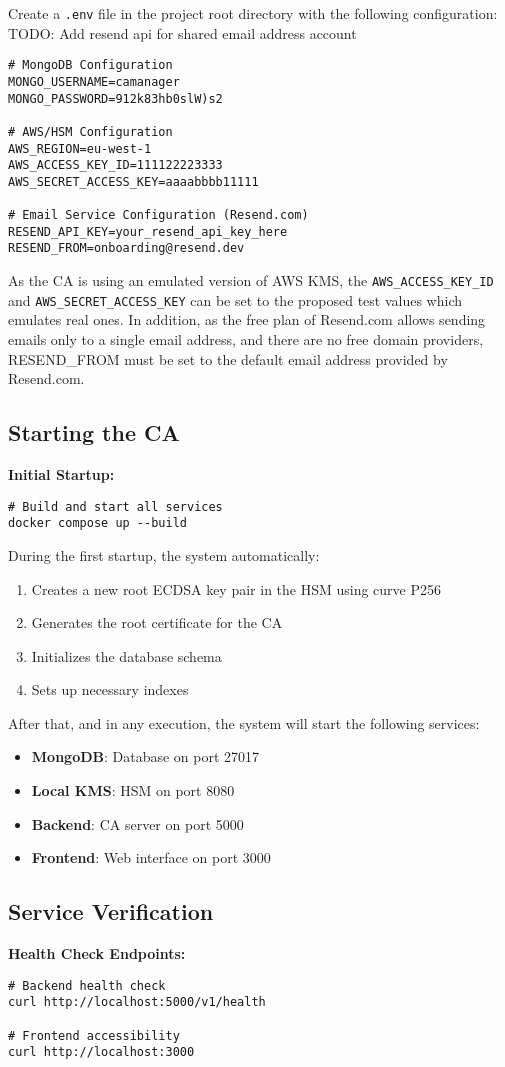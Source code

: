 Create a \texttt{.env} file in the project root directory with the following configuration:
{\color{red}TODO: Add resend api for shared email address account}
\begin{verbatim}
# MongoDB Configuration
MONGO_USERNAME=camanager
MONGO_PASSWORD=912k83hb0slW)s2

# AWS/HSM Configuration
AWS_REGION=eu-west-1
AWS_ACCESS_KEY_ID=111122223333
AWS_SECRET_ACCESS_KEY=aaaabbbb11111

# Email Service Configuration (Resend.com)
RESEND_API_KEY=your_resend_api_key_here
RESEND_FROM=onboarding@resend.dev
\end{verbatim}
As the CA is using an emulated version of AWS KMS, the 
\texttt{AWS\_ACCESS\_KEY\_ID} and \texttt{AWS\_SECRET\_ACCESS\_KEY} can be set to the proposed 
test values which emulates real ones. In addition, as the free plan of Resend.com allows sending 
emails only to a single email address, and there are no free domain providers, RESEND\_FROM must be 
set to the default email address provided by Resend.com.

\subsection{Starting the CA}

\textbf{Initial Startup:}
\begin{verbatim}
# Build and start all services
docker compose up --build
\end{verbatim}
During the first startup, the system automatically:
\begin{enumerate}
    \item Creates a new root ECDSA key pair in the HSM using curve P256
    \item Generates the root certificate for the CA
    \item Initializes the database schema
    \item Sets up necessary indexes
\end{enumerate}
After that, and in any execution, the system will start the following services:
\begin{itemize}
    \item \textbf{MongoDB}: Database on port 27017
    \item \textbf{Local KMS}: HSM on port 8080
    \item \textbf{Backend}: CA server on port 5000
    \item \textbf{Frontend}: Web interface on port 3000
\end{itemize}

\subsection{Service Verification}

\textbf{Health Check Endpoints:}
\begin{verbatim}
# Backend health check
curl http://localhost:5000/v1/health

# Frontend accessibility
curl http://localhost:3000
\end{verbatim}
